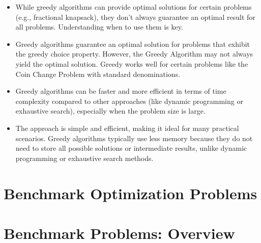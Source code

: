 \documentclass[
  letterpaper,
  DIV=11,
  numbers=noendperiod]{scrreprt}
\providecommand{\tightlist}{%
  \setlength{\itemsep}{0pt}\setlength{\parskip}{0pt}}\usepackage{longtable,booktabs,array}
\begin{document}
\begin{itemize}
\tightlist
\item
  While greedy algorithms can provide optimal solutions for certain
  problems (e.g., fractional knapsack), they don't always guarantee an
  optimal result for all problems. Understanding when to use them is
  key.
\item
  Greedy algorithms guarantee an optimal solution for problems that
  exhibit the greedy choice property. However, the Greedy Algorithm may
  not always yield the optimal solution. Greedy works well for certain
  problems like the Coin Change Problem with standard denominations.
\item
  Greedy algorithms can be faster and more efficient in terms of time
  complexity compared to other approaches (like dynamic programming or
  exhaustive search), especially when the problem size is large.
\item
  The approach is simple and efficient, making it ideal for many
  practical scenarios. Greedy algorithms typically use less memory
  because they do not need to store all possible solutions or
  intermediate results, unlike dynamic programming or exhaustive search
  methods.
\end{itemize}


\chapter{Benchmark Optimization
Problems}\label{benchmark-optimization-problems}


\chapter{Benchmark Problems:
Overview}\label{benchmark-problems-overview}
\end{document}
